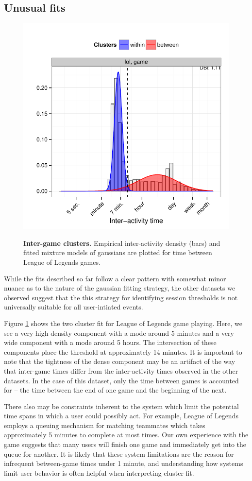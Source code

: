 \subsection{Unusual fits}
\begin{figure}
\centering
\includegraphics[width=.45\textwidth]{figures/weird_lol_clusters.pdf}
\label{fig:lol_game_clusters}
\caption{
    \textbf{Inter-game clusters.} Empirical inter-activity density (bars) and fitted mixture models of gaussians are plotted for time between League of Legends games.
}
\end{figure}
While the fits described so far follow a clear pattern with somewhat minor nuance as to the nature of the gaussian fitting strategy, the other datasets we observed suggest that the this strategy for identifying session thresholds is not universally suitable for all user-intiated events.

Figure \ref{fig:lol_game_clusters} shows the two cluster fit for League of Legends game playing.  Here, we see a very high density component with a mode around 5 minutes and a very wide component with a mode around 5 hours.  The intersection of these components place the threshold at approximately 14 minutes.  It is important to note that the tightness of the dense component may be an artifact of the way that inter-game times differ from the inter-activity times observed in the other datasets.  In the case of this dataset, only the time between games is accounted for -- the time between the end of one game and the beginning of the next.

There also may be constraints inherent to the system which limit the potential time spans in which a user could possibly act.  For example, League of Legends employs a queuing mechanism for matching teammates which takes approximately 5 minutes to complete at most times.  Our own experience with the game suggests that many users will finish one game and immediately get into the queue for another.  It is likely that these system limitations are the reason for infrequent between-game times under 1 minute, and understanding how systems limit user behavior is often helpful when interpreting cluster fit.


